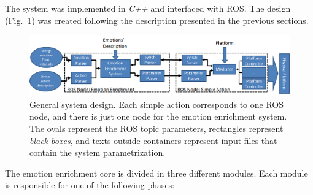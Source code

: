 
The system was implemented in \textit{C++} and interfaced with ROS. The design (Fig.~\ref{fig:system_architecture}) was created following the description presented in the previous sections. 
\begin{figure}
	\centering
	\includegraphics[width=1.0\textwidth]{Images/SystemArchitecture.png} 	
	\caption{General system design. Each simple action corresponds to one ROS node, and there is just one node for the emotion enrichment system. The ovals represent the ROS topic parameters, rectangles represent \textit{black boxes}, and texts outside containers represent input files that contain the system parametrization.}
	\label{fig:system_architecture}
\end{figure}
The emotion enrichment core is divided in three different modules. 
Each module is responsible for one of the following phases:
